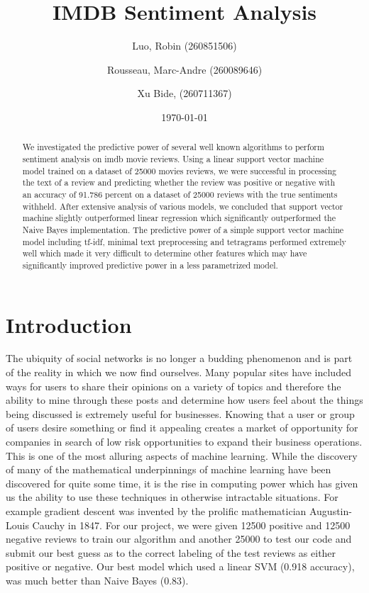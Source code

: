 \documentclass{amsart}
\theoremstyle{definition}
\theoremstyle{remark}
\numberwithin{equation}{section}
\begin{document}
\vspace*{-80pt}

\title{IMDB Sentiment Analysis}

\author{Luo, Robin (260851506)}
\author{Rousseau, Marc-Andre  (260089646)}
\author{Xu Bide, (260711367)}

\date{\today}
\begin{abstract}
We investigated the predictive power of several well known algorithms to perform sentiment analysis on imdb movie reviews.  Using a linear support vector machine model trained on a dataset of 25000 movies reviews, we were successful in processing the text of a review and predicting whether the review was positive or negative with an accuracy of 91.786 percent on a dataset of 25000 reviews with the true sentiments withheld.  After extensive analysis of various models, we concluded that support vector machine slightly outperformed linear regression which significantly outperformed the Naive Bayes implementation.  The predictive power of a simple support vector machine model including tf-idf, minimal text preprocessing and tetragrams performed extremely well which made it very difficult to determine other features which may have significantly improved predictive power in a less parametrized model.
\end{abstract}
\maketitle
\section{Introduction}
The ubiquity of social networks is no longer a budding phenomenon and is part of the reality in which we now find ourselves.  Many popular sites have included ways for users to share their opinions on a variety of topics and therefore the ability to mine through these posts and determine how users feel about the things being discussed is extremely useful for businesses.  Knowing that a user or group of users desire something or find it appealing creates a market of opportunity for companies in search of low risk opportunities to expand their business operations.  This is one of the most alluring aspects of machine learning.  While the discovery of many of the mathematical underpinnings of machine learning have been discovered for quite some time, it is the rise in computing power which has given us the ability to use these techniques in otherwise intractable situations.  For example gradient descent was invented by the prolific mathematician Augustin-Louis Cauchy in 1847.  For our project, we were given 12500 positive and 12500 negative reviews to train our algorithm and another 25000 to test our code and submit our best guess as to the correct labeling of the test reviews as either positive or negative.  Our best model which used a linear SVM (0.918 accuracy), was much better than Naive Bayes (0.83).
\end{document}
